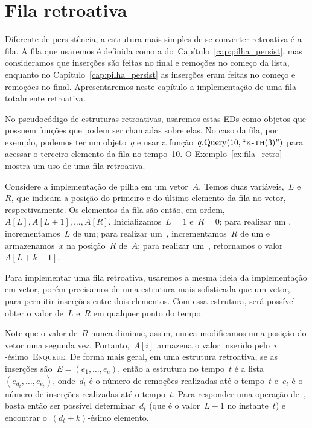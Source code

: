 \documentclass[main.tex]{subfiles}
\begin{document}
\chapter{Fila retroativa} \label{cap:pilha_retro}

Diferente de persistência, a estrutura mais simples de se converter retroativa é a fila. A fila que usaremos é definida como a do~Capítulo~\ref{cap:pilha_persist}, mas consideramos que inserções são feitas no final e remoções no começo da lista, enquanto no Capítulo~\ref{cap:pilha_persist} as inserções eram feitas no começo e remoções no final. Apresentaremos neste capítulo a implementação de uma fila totalmente retroativa.

No pseudocódigo de estruturas retroativas, usaremos estas EDs como objetos que possuem funções que podem ser chamadas sobre elas. No caso da fila, por exemplo, podemos ter um objeto~$q$ e usar a função~$q.\text{Query}(10, ``\textsc{k-th}(3)")$ para acessar o terceiro elemento da fila no tempo~10. O Exemplo~\ref{ex:fila_retro} mostra um uso de uma fila retroativa.

Considere a implementação de pilha em um vetor~$A$. Temos duas variáveis,~$L$ e~$R$, que indicam a posição do primeiro e do último elemento da fila no vetor, respectivamente. Os elementos da fila são então, em ordem,~$A[L], A[L + 1], \ldots, A[R]$. Inicializamos~$L = 1$ e~$R = 0$; para realizar um , incrementamos~$L$ de um; para realizar um~, incrementamos~$R$ de um e armazenamos~$x$ na posição~$R$ de~$A$; para realizar um~, retornamos o valor~$A[L + k - 1]$.

Para implementar uma fila retroativa, usaremos a mesma ideia da implementação em vetor, porém precisamos de uma estrutura mais sofisticada que um vetor, para permitir inserções entre dois elementos. Com essa estrutura, será possível obter o valor de~$L$ e~$R$ em qualquer ponto do tempo.

Note que o valor de~$R$ nunca diminue, assim, nunca modificamos uma posição do vetor uma segunda vez. Portanto,~$A[i]$ armazena o valor inserido pelo~$i$-ésimo~\textsc{Enqueue}. De forma mais geral, em uma estrutura retroativa, se as inserções são~$E = (e_1, \ldots, e_e)$, então a estrutura no tempo~$t$ é a lista~$(e_{d_t}, \ldots, e_{e_t})$, onde~$d_t$ é o número de remoções realizadas até o tempo~$t$ e~$e_t$ é o número de inserções realizadas até o tempo~$t$. Para responder uma operação de~, basta então ser possível determinar~$d_t$ (que é o valor~$L - 1$ no instante~$t$) e encontrar o~$(d_t + k)$-ésimo elemento.
\end{document}
